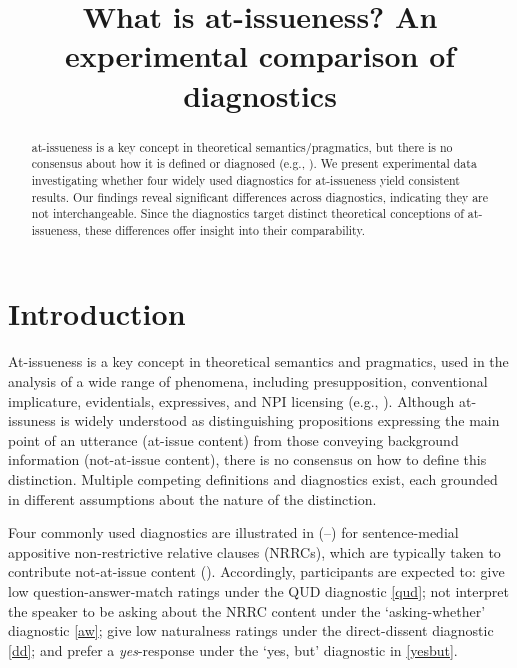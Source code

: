 \documentclass[times,linguex,xcolor]{glossa}
\title[What is at-issueness?]{What is at-issueness? An experimental comparison of diagnostics\\ 
  }
\author[]%
{%
}
\begin{document}
\maketitle


\begin{abstract}
  at-issueness is a key concept in theoretical semantics/pragmatics, but there is no consensus about how it is defined or diagnosed (e.g., \citealt{tonhauser_diagnosing_2012,snider_anaphoric_2017,snider_distinguishing_2018,tonhauser_how_2018,koev_notions_2018,faller_discourse_2019,korotkova_evidential_2020}). We present experimental data investigating whether four widely used diagnostics for at-issueness yield consistent results. Our findings reveal significant differences across diagnostics, indicating they are not interchangeable. Since the diagnostics target distinct theoretical conceptions of at-issueness, these differences offer insight into their comparability.

\end{abstract}


\section{Introduction \label{sec:1_introduction}}
  
  At-issueness is a key concept in theoretical semantics and pragmatics, used in the analysis of a wide range of phenomena, including presupposition, conventional implicature, evidentials, expressives, and NPI licensing (e.g., \citealt{karttunen_conventional_1979,horton_presuppositions_1988,abbott_presuppositions_2000,faller_semantics_2003,potts_logic_2005,tonhauser_diagnosing_2012,horn_licensing_2016}). Although at-issuness is widely understood as distinguishing propositions expressing the main point of an utterance (at-issue content) from those conveying background information (not-at-issue content), there is no consensus on how to define this distinction. Multiple competing definitions and diagnostics exist, each grounded in different assumptions about the nature of the distinction.

  Four commonly used diagnostics are illustrated in (--) for sentence-medial appositive non-restrictive relative clauses (NRRCs), which are typically taken to contribute not-at-issue content (\citealt{potts_logic_2005}). Accordingly, participants are expected to: give low question-answer-match ratings under the QUD diagnostic \ref{qud}; not interpret the speaker to be asking about the NRRC content under the `asking-whether' diagnostic \ref{aw}; give low naturalness ratings under the direct-dissent diagnostic \ref{dd}; and prefer a \emph{yes}-response under the `yes, but' diagnostic in \ref{yesbut}.
\end{document}
